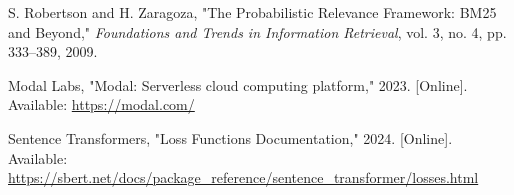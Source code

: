 \documentclass[conference]{IEEEtran}
\begin{document}
\begin{thebibliography}{00}
 S. Robertson and H. Zaragoza, "The Probabilistic Relevance Framework: BM25 and Beyond," \textit{Foundations and Trends in Information Retrieval}, vol. 3, no. 4, pp. 333--389, 2009.

 Modal Labs, "Modal: Serverless cloud computing platform," 2023. [Online]. Available: \url{https://modal.com/}

 Sentence Transformers, "Loss Functions Documentation," 2024. [Online]. Available: \url{https://sbert.net/docs/package_reference/sentence_transformer/losses.html}
\end{thebibliography}
\end{document}
